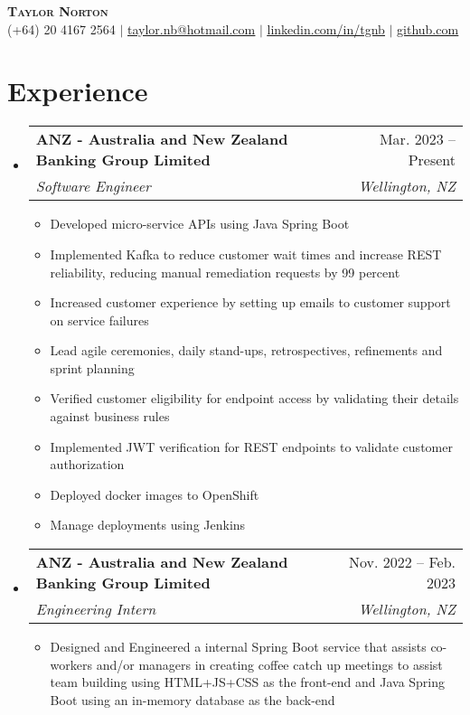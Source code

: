 \documentclass[letterpaper,11pt]{article}
\makeatletter
\newcommand{\resumeItem}[1]{
  \item\small{
    {#1 \vspace{-2pt}}
  }
}
\newcommand{\resumeSubheading}[4]{
  \vspace{-2pt}\item
    \begin{tabular*}{0.97\textwidth}[t]{l@{\extracolsep{\fill}}r}
      \textbf{#1} & #2 \\
      \textit{\small#3} & \textit{\small #4} \\
    \end{tabular*}\vspace{-7pt}
}
\newcommand{\resumeSubSubheading}[2]{
    \item
    \begin{tabular*}{0.97\textwidth}{l@{\extracolsep{\fill}}r}
      \textit{\small#1} & \textit{\small #2} \\
    \end{tabular*}\vspace{-7pt}
}
\newcommand{\resumeSubHeadingListStart}{\begin{itemize}[leftmargin=0.15in, label={}]}
\newcommand{\resumeSubHeadingListEnd}{\end{itemize}}
\newcommand{\resumeItemListStart}{\begin{itemize}\vspace{0pt}}
\newcommand{\resumeItemListEnd}{\end{itemize}\vspace{0pt}}
\makeatother
\begin{document}

\begin{center}
    \textbf{\Huge \scshape Taylor Norton} \\ \vspace{1pt}
    \small (+64) 20 4167 2564 $|$ \href{mailto:taylor.nb@hotmail.com}{\underline{taylor.nb@hotmail.com}} $|$ 
    \href{https://linkedin.com/in/tgnb}{\underline{linkedin.com/in/tgnb}} $|$
    \href{https://github.com/lil-snorts}{\underline{github.com}}
\end{center}



\section{Experience}
  \resumeSubHeadingListStart
    \resumeSubheading
      {ANZ - Australia and New Zealand Banking Group Limited}{Mar. 2023 -- Present}
      {Software Engineer}{Wellington, NZ}
      \resumeItemListStart
        \resumeItem{Developed micro-service APIs using Java Spring Boot}
        \resumeItem{Implemented Kafka to reduce customer wait times and increase REST reliability, reducing manual remediation requests by 99 percent}
        \resumeItem{Increased customer experience by setting up emails to customer support on service failures}
        \resumeItem{Lead agile ceremonies, daily stand-ups, retrospectives, refinements and sprint planning}
        \resumeItem{Verified customer eligibility for endpoint access by validating their details against business rules}
        \resumeItem{Implemented JWT verification for REST endpoints to validate customer authorization}
        \resumeItem{Deployed docker images to OpenShift}
        \resumeItem{Manage deployments using Jenkins}
    \resumeItemListEnd
        
    \resumeSubheading
      {ANZ - Australia and New Zealand Banking Group Limited}{Nov. 2022 -- Feb. 2023}
      {Engineering Intern}{Wellington, NZ}
      \resumeItemListStart
        \resumeItem{Designed and Engineered a internal Spring Boot service that assists co-workers and/or managers in creating coffee catch up meetings to assist team building using HTML+JS+CSS as the front-end and Java Spring Boot using an in-memory database as the back-end}
      \resumeItemListEnd
    \resumeSubHeadingListEnd      
\end{document}
